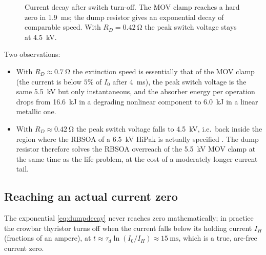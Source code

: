 \documentclass[11pt,a4paper]{article}
\begin{document}
\begin{figure}[htb]
\centering
{}
\caption{Current decay after switch turn-off. The MOV clamp reaches a hard
zero in \SI{1.9}{\milli\second}; the dump resistor gives an exponential decay
of comparable speed. With $R_D=\SI{0.42}{\ohm}$ the peak switch voltage stays
at \SI{4.5}{\kilo\volt}.}
\label{fig:decay}
\end{figure}

Two observations:
\begin{itemize}
\item With $R_D \approx \SI{0.7}{\ohm}$ the extinction speed is essentially
that of the MOV clamp (the current is below $5\%$ of $I_0$ after
\SI{4}{\milli\second}), the peak switch voltage is the same
\SI{5.5}{\kilo\volt} but only instantaneous, and the absorber energy per
operation drops from \SI{16.6}{\kilo\joule} in a degrading nonlinear
component to \SI{6.0}{\kilo\joule} in a linear metallic one.
\item With $R_D \approx \SI{0.42}{\ohm}$ the peak switch voltage falls to
\SI{4.5}{\kilo\volt}, i.e.\ back inside the region where the RBSOA of a
\SI{6.5}{\kilo\volt} HiPak is actually specified \cite{hipak,igbtapp}. The
dump resistor therefore solves the RBSOA overreach of the
\SI{5.5}{\kilo\volt} MOV clamp at the same time as the life problem, at the
cost of a moderately longer current tail.
\end{itemize}

\subsection{Reaching an actual current zero}

The exponential \eqref{eq:dumpdecay} never reaches zero mathematically; in
practice the crowbar thyristor turns off when the current falls below its
holding current $I_H$ (fractions of an ampere), at
$t \approx \tau_d \ln(I_0/I_H) \approx \SI{15}{\milli\second}$, which is a
true, arc-free current zero.
\end{document}
